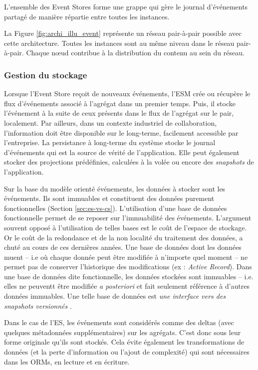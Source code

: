 L'ensemble des Event Stores forme une grappe qui gère le 
journal d'événements partagé de manière répartie entre toutes les instances.

La Figure \ref{fig:archi_illu_event} représente un réseau pair-à-pair 
possible avec cette architecture. Toutes les instances sont au même niveau dans 
le réseau pair-à-pair. Chaque n\oe ud contribue à la distribution du contenu au sein 
du réseau.

\subsubsection{Gestion du stockage}

Lorsque l'Event Store reçoit de nouveaux événements, l'\gls{ESM} crée ou 
récupère le flux d'événements associé à l'agrégat dans un premier temps. Puis, il 
stocke l'événement à la suite de ceux présents dans le flux de l'agrégat sur le pair, 
localement.
Par ailleurs, dans un contexte industriel de collaboration, l'information doit être 
disponible sur le long-terme, facilement accessible par l'entreprise. 
La persistance à long-terme du système stocke le journal d'événements qui est la 
source de vérité de l'application. Elle peut également stocker des projections 
prédéfinies, calculées à la volée ou encore des \textit{snapshots} de l'application.

Sur la base du modèle orienté événements, les données à stocker sont les 
événements. Ils sont immuables et constituent des données purement 
fonctionnelles (Section \ref{sec:es-vs-cs}).
L'utilisation d'une base de données fonctionnelle permet de se reposer sur 
l'immuabilité des événements.
L'argument souvent opposé à l'utilisation de telles bases est le coût de l'espace de 
stockage. Or le coût de la redondance et de la non localité du traitement des 
données, a chuté au cours de ces dernières années. 
Une base de données dont les données muent -- i.e où chaque donnée peut être 
modifiée à n'importe quel moment -- ne permet pas de conserver l'historique des 
modifications (ex : \textit{Active Record}). Dans une base de données dite 
fonctionnelle, les données stockées sont immuables -- i.e. elles ne peuventt être modifiée \textit{a posteriori} et fait seulement référence à 
d'autres données immuables. Une telle base de données est \og \textit{une interface vers 
des \textit{snapshots} versionnés}\fg{} \cite{Meric2012}.

Dans le cas de l'\gls{ES}, les événements sont considérés comme des deltas 
(avec quelques métadonnées supplémentaires) sur les agrégats. C'est donc sous 
leur forme originale qu'ils sont stockés. Cela évite également les transformations 
de données (et la perte d'information ou l'ajout de complexité) qui sont nécessaires 
dans les \glspl{ORM}, en lecture et en écriture.

